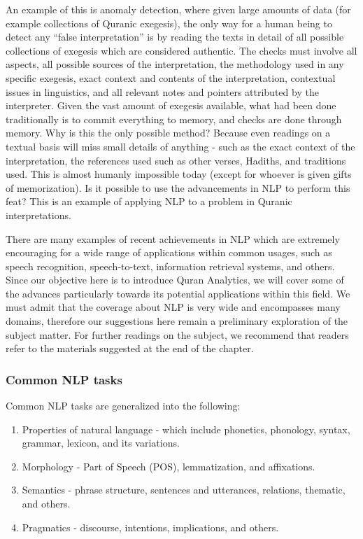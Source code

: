 \documentclass[
]{article}
\providecommand{\tightlist}{%
  \setlength{\itemsep}{0pt}\setlength{\parskip}{0pt}}
\begin{document}
An example of this is anomaly detection, where given large amounts of data (for example collections of Quranic exegesis), the only way for a human being to detect any ``false interpretation'' is by reading the texts in detail of all possible collections of exegesis which are considered authentic. The checks must involve all aspects, all possible sources of the interpretation, the methodology used in any specific exegesis, exact context and contents of the interpretation, contextual issues in linguistics, and all relevant notes and pointers attributed by the interpreter. Given the vast amount of exegesis available, what had been done traditionally is to commit everything to memory, and checks are done through memory. Why is this the only possible method? Because even readings on a textual basis will miss small details of anything - such as the exact context of the interpretation, the references used such as other verses, Hadiths, and traditions used. This is almost humanly impossible today (except for whoever is given gifts of memorization). Is it possible to use the advancements in NLP to perform this feat? This is an example of applying NLP to a problem in Quranic interpretations.

There are many examples of recent achievements in NLP which are extremely encouraging for a wide range of applications within common usages, such as speech recognition, speech-to-text, information retrieval systems, and others. Since our objective here is to introduce Quran Analytics, we will cover some of the advances particularly towards its potential applications within this field. We must admit that the coverage about NLP is very wide and encompasses many domains, therefore our suggestions here remain a preliminary exploration of the subject matter. For further readings on the subject, we recommend that readers refer to the materials suggested at the end of the chapter.

\hypertarget{common-NLP-tasks}{%
\subsubsection{Common NLP tasks}\label{common-NLP-tasks}}

Common NLP tasks are generalized into the following:

\begin{enumerate}
\def\labelenumi{\arabic{enumi}.}
\tightlist
\item
  Properties of natural language - which include phonetics, phonology, syntax, grammar, lexicon, and its variations.
\item
  Morphology - Part of Speech (POS), lemmatization, and affixations.
\item
  Semantics - phrase structure, sentences and utterances, relations, thematic, and others.
\item
  Pragmatics - discourse, intentions, implications, and others.
\end{enumerate}
\end{document}
